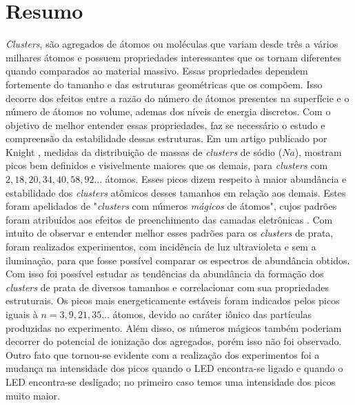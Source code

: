 \chapter*{Resumo}

\textit{Clusters}, são agregados de átomos ou moléculas que variam desde três a vários milhares átomos e possuem propriedades interessantes que os tornam diferentes quando comparados ao material massivo. Essas propriedades dependem fortemente do tamanho e das estruturas geométricas que os compõem. Isso decorre dos efeitos entre a razão do número de átomos presentes na superfície e o número de átomos no
volume, ademas dos níveis  de energia discretos. Com o objetivo de melhor entender essas propriedades, faz se necessário o estudo e compreensão da estabilidade dessas estruturas. Em um artigo publicado por Knight \cite{electronic_Shell_sodium}, medidas da distribuição de massas de \textit{clusters} de sódio ($Na$), mostram picos bem definidos e visivelmente maiores que os demais, para \textit{clusters} com $2, 18, 20, 34, 40, 58,92 ...$ átomos. Esses picos dizem respeito à maior abundância e estabilidade dos \textit{clusters} atômicos desses tamanhos em relação aos demais. Estes foram apelidados de "\textit{clusters} com números
\textit{mágicos} de átomos", cujos padrões foram atribuídos aos efeitos de preenchimento das camadas eletrônicas \cite{Brack}. Com intuito de observar e entender melhor esses padrões para os \textit{clusters} de prata, foram realizados experimentos, com incidência de luz ultravioleta e sem a iluminação, para que fosse possível comparar os espectros  de abundância obtidos. Com isso foi possível estudar as tendências da abundância da formação dos \textit{clusters} de prata de diversos tamanhos e correlacionar com sua propriedades estruturais. Os picos mais energeticamente estáveis foram indicados pelos picos iguais à $n= 3,9,21,35...$ átomos, devido ao caráter iônico das partículas produzidas no experimento. Além disso, os números mágicos também poderiam decorrer do potencial de ionização dos agregados, porém isso não foi observado. Outro fato que tornou-se evidente com a realização dos experimentos foi a mudança na intensidade dos picos quando o LED encontra-se ligado e quando o LED encontra-se desligado; no primeiro caso   temos uma intensidade dos picos muito maior.

\newpage

$ $